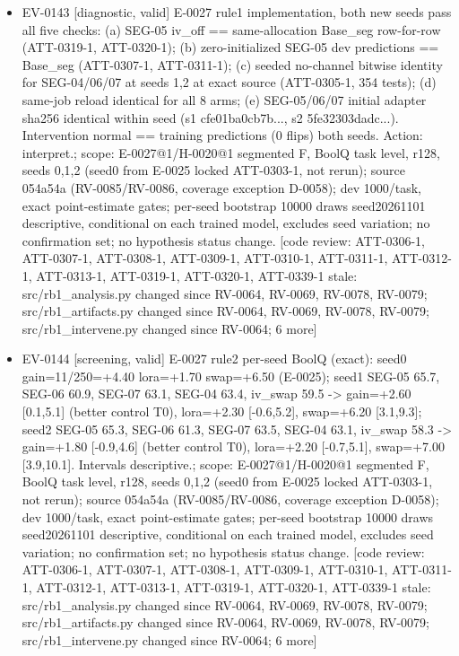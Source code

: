 \documentclass[11pt]{article}
\begin{document}
\begin{itemize}
\item EV-0143 [diagnostic, valid] E-0027 rule1 implementation, both new seeds pass all five checks: (a) SEG-05 iv\_off == same-allocation Base\_seg row-for-row (ATT-0319-1, ATT-0320-1); (b) zero-initialized SEG-05 dev predictions == Base\_seg (ATT-0307-1, ATT-0311-1); (c) seeded no-channel bitwise identity for SEG-04/06/07 at seeds 1,2 at exact source (ATT-0305-1, 354 tests); (d) same-job reload identical for all 8 arms; (e) SEG-05/06/07 initial adapter sha256 identical within seed (s1 cfe01ba0cb7b..., s2 5fe32303dadc...). Intervention normal == training predictions (0 flips) both seeds. Action: interpret.; scope: E-0027@1/H-0020@1 segmented F, BoolQ task level, r128, seeds 0,1,2 (seed0 from E-0025 locked ATT-0303-1, not rerun); source 054a54a (RV-0085/RV-0086, coverage exception D-0058); dev 1000/task, exact point-estimate gates; per-seed bootstrap 10000 draws seed20261101 descriptive, conditional on each trained model, excludes seed variation; no confirmation set; no hypothesis status change. [code review: ATT-0306-1, ATT-0307-1, ATT-0308-1, ATT-0309-1, ATT-0310-1, ATT-0311-1, ATT-0312-1, ATT-0313-1, ATT-0319-1, ATT-0320-1, ATT-0339-1 stale: src/rb1\_analysis.py changed since RV-0064, RV-0069, RV-0078, RV-0079; src/rb1\_artifacts.py changed since RV-0064, RV-0069, RV-0078, RV-0079; src/rb1\_intervene.py changed since RV-0064; 6 more]
\item EV-0144 [screening, valid] E-0027 rule2 per-seed BoolQ (exact): seed0 gain=11/250=+4.40 lora=+1.70 swap=+6.50 (E-0025); seed1 SEG-05 65.7, SEG-06 60.9, SEG-07 63.1, SEG-04 63.4, iv\_swap 59.5 -\textgreater{} gain=+2.60 [0.1,5.1] (better control T0), lora=+2.30 [-0.6,5.2], swap=+6.20 [3.1,9.3]; seed2 SEG-05 65.3, SEG-06 61.3, SEG-07 63.5, SEG-04 63.1, iv\_swap 58.3 -\textgreater{} gain=+1.80 [-0.9,4.6] (better control T0), lora=+2.20 [-0.7,5.1], swap=+7.00 [3.9,10.1]. Intervals descriptive.; scope: E-0027@1/H-0020@1 segmented F, BoolQ task level, r128, seeds 0,1,2 (seed0 from E-0025 locked ATT-0303-1, not rerun); source 054a54a (RV-0085/RV-0086, coverage exception D-0058); dev 1000/task, exact point-estimate gates; per-seed bootstrap 10000 draws seed20261101 descriptive, conditional on each trained model, excludes seed variation; no confirmation set; no hypothesis status change. [code review: ATT-0306-1, ATT-0307-1, ATT-0308-1, ATT-0309-1, ATT-0310-1, ATT-0311-1, ATT-0312-1, ATT-0313-1, ATT-0319-1, ATT-0320-1, ATT-0339-1 stale: src/rb1\_analysis.py changed since RV-0064, RV-0069, RV-0078, RV-0079; src/rb1\_artifacts.py changed since RV-0064, RV-0069, RV-0078, RV-0079; src/rb1\_intervene.py changed since RV-0064; 6 more]

\end{itemize}
\end{document}
